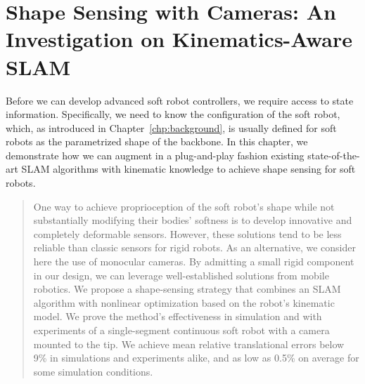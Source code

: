 \chapter{Shape Sensing with Cameras: An Investigation on Kinematics-Aware SLAM}
\label{chp:srslam}

\begin{foreword}
    Before we can develop advanced soft robot controllers, we require access to state information. Specifically, we need to know the configuration of the soft robot, which, as introduced in Chapter~\ref{chp:background}, is usually defined for soft robots as the parametrized shape of the backbone.
    In this chapter, we demonstrate how we can augment in a plug-and-play fashion existing state-of-the-art \gls{SLAM} algorithms with kinematic knowledge to achieve shape sensing for soft robots.
\end{foreword}

\begin{abstract}
    One way to achieve proprioception of the soft robot's shape while not substantially modifying their bodies' softness is to develop innovative and completely deformable sensors. 
    However, these solutions tend to be less reliable than classic sensors for rigid robots. As an alternative, we consider here the use of monocular cameras. By admitting a small rigid component in our design, we can leverage well-established solutions from mobile robotics. We propose a shape-sensing strategy that combines an SLAM algorithm with nonlinear optimization based on the robot's kinematic model. We prove the method's effectiveness in simulation and with experiments of a single-segment continuous soft robot with a camera mounted to the tip. We achieve mean relative translational errors below 9\% in simulations and experiments alike, and as low as 0.5\% on average for some simulation conditions.
\end{abstract}

